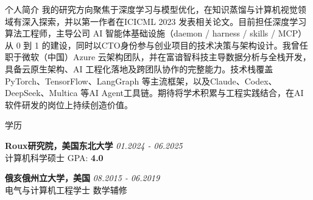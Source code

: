 \documentclass{resume} %
\begin{document}
\begin{rSection}{个人简介}
  我的研究方向聚焦于深度学习与模型优化，在知识蒸馏与计算机视觉领域有深入探索，并以第一作者在ICICML 2023 发表相关论文。目前担任深度学习算法工程师，主导公司 AI 智能体基础设施（daemon / harness / skills / MCP）从 0 到 1 的建设，同时以CTO身份参与创业项目的技术决策与架构设计。我曾任职于微软（中国）Azure 云架构团队，并在富谙智科技主导数据分析与全栈开发，具备云原生架构、AI 工程化落地及跨团队协作的完整能力。技术栈覆盖PyTorch、TensorFlow、LangGraph 等主流框架，以及Claude、Codex、DeepSeek、Multica 等AI Agent工具链。期待将学术积累与工程实践结合，在AI 软件研发的岗位上持续创造价值。
\end{rSection}

\begin{rSection}{学历}

  {\bf Roux研究院，美国东北大学} \hfill {\em 01.2024 - 06.2025} \\
  计算机科学硕士 \hfill GPA: \textbf {4.0}

  {\bf 俄亥俄州立大学，美国} \hfill {\em 08.2015 - 06.2019} \\
  电气与计算机工程学士 \hfill 数学辅修

\end{rSection}
\end{document}
